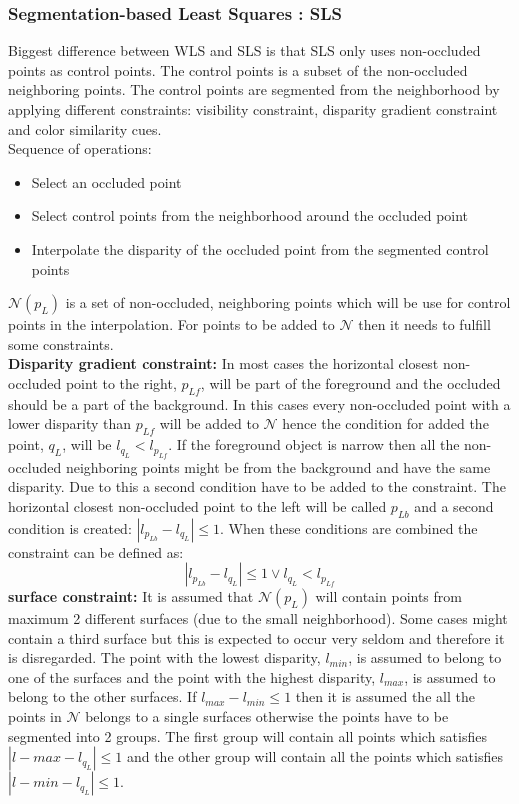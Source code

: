 \subsubsection{Segmentation-based Least Squares : SLS}
Biggest difference between WLS and SLS is that SLS only uses non-occluded points as control points. The control points is a subset of the non-occluded neighboring points. The control points are segmented from the neighborhood by applying different constraints: visibility constraint, disparity gradient constraint and color similarity cues. \\
Sequence of operations: 
\begin{itemize}
\item Select an occluded point
\item Select control points from the neighborhood around the occluded point
\item Interpolate the disparity of the occluded point from the segmented control points 
\end{itemize}
$\mathcal{N}(p_L)$ is a set of non-occluded, neighboring points which will be use for control points in the interpolation. For points to be added to $\mathcal{N}$ then it needs to fulfill some constraints.\\
\textbf{Disparity gradient constraint:} In most cases the horizontal closest non-occluded point to the right, $p_{Lf}$, will be part of the foreground and the occluded should be a part of the background. In this cases every non-occluded point with a lower disparity than $p_{Lf}$ will be added to $\mathcal{N}$ hence the condition for added the point, $q_L$, will be $l_{q_L} < l_{p_{Lf}}$. If the foreground object is narrow then all the non-occluded neighboring points might be from the background and have the same disparity. Due to this a second condition have to be added to the constraint. The horizontal closest non-occluded point to the left will be called $p_{Lb}$ and a second condition is created: $| l_{p_{Lb}} - l_{q_L} | \leq 1$. When these conditions are combined the constraint can be defined as:
\begin{equation}
| l_{p_{Lb}} - l_{q_L} | \leq 1 \vee  l_{q_L} < l_{p_{Lf}}  
\end{equation}
\textbf{surface constraint:} It is assumed that $\mathcal{N}(p_L)$ will contain points from maximum 2 different surfaces (due to the small neighborhood). Some cases might contain a third surface but this is expected to occur very seldom and therefore it is disregarded. The point with the lowest disparity, $l_{min}$, is assumed to belong to one of the surfaces and the point with the highest disparity, $l_{max}$, is assumed to belong to the other surfaces. If $l_{max} - l_{min} \leq 1$ then it is assumed the all the points in $\mathcal{N}$ belongs to a single surfaces otherwise the points have to be segmented into 2 groups. The first group will contain all points which satisfies $| l-{max} - l_{q_L} | \leq 1$ and the other group will contain all the points which satisfies $| l-{min} - l_{q_L} | \leq 1$.
